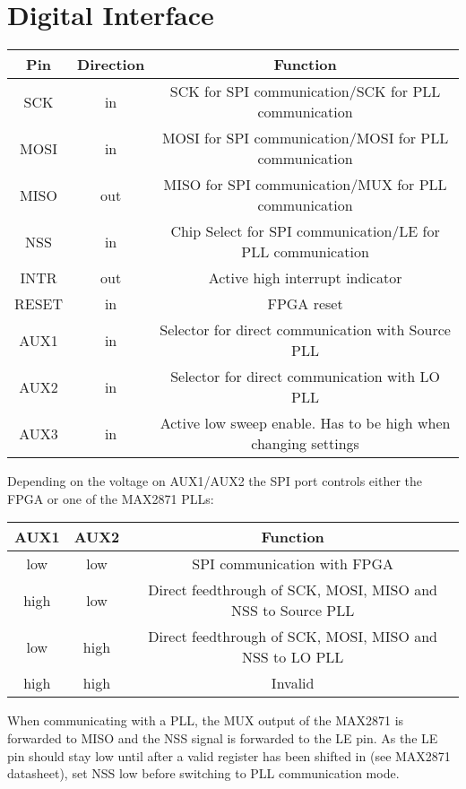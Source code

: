\documentclass{article}
\begin{document}
\section{Digital Interface}
\begin{center}
\begin{tabular}{ c|c|c }
Pin & Direction & Function\\
 \hline
SCK & in & SCK for SPI communication/SCK for PLL communication\\
MOSI & in & MOSI for SPI communication/MOSI for PLL communication\\
MISO & out & MISO for SPI communication/MUX for PLL communication\\
NSS & in & Chip Select for SPI communication/LE for PLL communication\\
INTR & out & Active high interrupt indicator\\
RESET & in & FPGA reset\\
AUX1 & in & Selector for direct communication with Source PLL\\
AUX2 & in & Selector for direct communication with LO PLL\\
AUX3 & in & Active low sweep enable. Has to be high when changing settings\\
\end{tabular}
\end{center}
Depending on the voltage on AUX1/AUX2 the SPI port controls either the FPGA or one of the MAX2871 PLLs:
\begin{center}
\begin{tabular}{ c|c|c }
AUX1 & AUX2 & Function\\
 \hline
low & low & SPI communication with FPGA\\
high & low & Direct feedthrough of SCK, MOSI, MISO and NSS to Source PLL\\
low & high & Direct feedthrough of SCK, MOSI, MISO and NSS to LO PLL\\
high & high & Invalid\\
\end{tabular}
\end{center}
When communicating with a PLL, the MUX output of the MAX2871 is forwarded to MISO and the NSS signal is forwarded to the LE pin. As the LE pin should stay low until after a valid register has been shifted in (see MAX2871 datasheet), set NSS low before switching to PLL communication mode.
\end{document}
